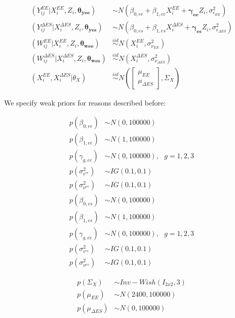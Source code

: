 \documentclass[11pt]{article}\usepackage[]{graphicx}\usepackage[]{color}
\begin{document}
\begin{align}
  (Y_{ij}^{EE}|X_i^{EE}, Z_i,\boldsymbol{\theta_{yee}}) &\sim N(\beta_{0,ee} + \beta_{1,ee}X_i^{EE} + \boldsymbol{\gamma_{ee}}Z_i, \sigma_{\epsilon_{EE}}^2) \\
  (Y_{ij}^{\Delta ES}|X_i^{\Delta ES}, Z_i,\boldsymbol{\theta_{yes}}) &\sim N(\beta_{0,es} + \beta_{1,es}X_i^{\Delta ES} +  \boldsymbol{\gamma_{es}}Z_i, \sigma_{\epsilon_{\Delta ES}}^2) \\
  (W_{ij}^{EE}|X_i^{EE}, Z_i,\boldsymbol{\theta_{wee}}) &\overset{iid}{\sim} N(X_i^{EE}, \sigma_{\nu_{EE}}^2 ) \\
  (W_{ij}^{\Delta ES}|X_i^{\Delta ES}, Z_i,\boldsymbol{\theta_{wes}}) &\overset{iid}{\sim} N(X_i^{\Delta ES}, \sigma_{\nu_{\Delta ES}}^2 )  \\
  (X_i^{EE},X_i^{\Delta ES}|\theta_X) &\overset{iid}{\sim} N\left(
  \begin{bmatrix}
  \mu_{EE}\\
  \mu_{\Delta ES}
  \end{bmatrix}
  , \Sigma_X
  \right)
\end{align}

We specify weak priors for reasons described before:

\begin{multicols}{2}
\noindent 
  \begin{align}
  p(\beta_{0,ee}) &\sim N(0,100000) \\
  p(\beta_{1,ee}) &\sim N(1,100000) \\
  p(\gamma_{g,ee}) &\sim N(0,100000), \text{ } g=1,2,3 \\
  p(\sigma^2_{\epsilon^{ee}}) &\sim IG(0.1,0.1) \\
  p(\sigma^2_{\nu^{ee}}) &\sim IG(0.1,0.1) 
  \end{align}
\columnbreak
  \begin{align}
  p(\beta_{0,es}) &\sim N(0,100000) \\
  p(\beta_{1,es}) &\sim N(1,100000) \\
  p(\gamma_{g,ee}) &\sim N(0,100000), \text{ } g=1,2,3 \\
  p(\sigma^2_{\epsilon^{es}}) &\sim IG(0.1,0.1) \\
  p(\sigma^2_{\nu^{es}}) &\sim IG(0.1,0.1) 
  \end{align}
\end{multicols}

\begin{align}
   p(\Sigma_X) &\sim Inv-Wish(I_{2x2},3)\\
   p(\mu_{EE}) &\sim N(2400,100000) \\
   p(\mu_{\Delta ES}) &\sim N(0,100000)
\end{align}
\end{document}
